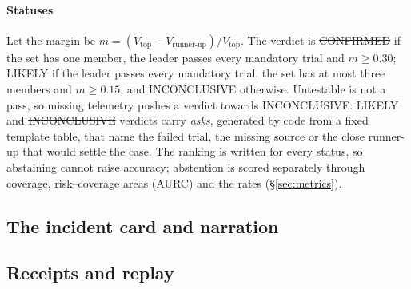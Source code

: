 \paragraph{Statuses}
Let the margin be $m = (V_\text{top} - V_\text{runner-up})/V_\text{top}$.
The verdict is \st{CONFIRMED} if the set has one member, the leader passes every mandatory trial and $m \geq 0.30$; \st{LIKELY} if the leader passes every mandatory trial, the set has at most three members and $m \geq 0.15$; and \st{INCONCLUSIVE} otherwise.
Untestable is not a pass, so missing telemetry pushes a verdict towards \st{INCONCLUSIVE}.
\st{LIKELY} and \st{INCONCLUSIVE} verdicts carry \emph{asks}, generated by code from a fixed template table, that name the failed trial, the missing source or the close runner-up that would settle the case.
The ranking is written for every status, so abstaining cannot raise accuracy; abstention is scored separately through coverage, risk--coverage areas (AURC) and the \NOFAULT rates (\S\ref{sec:metrics}).

\subsection{The incident card and narration}
\label{sec:card}


\subsection{Receipts and replay}
\label{sec:receipts}

